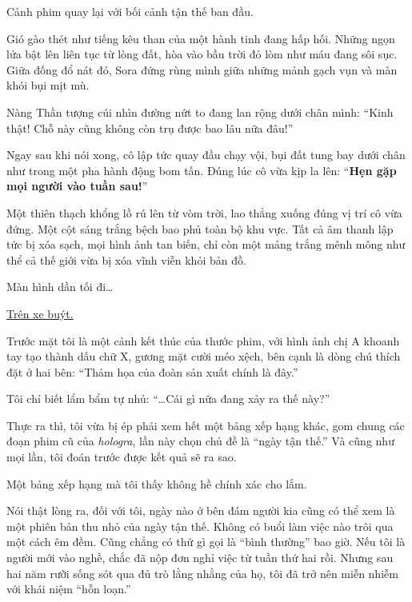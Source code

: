 \documentclass[../main.tex]{subfiles}
\begin{document}
\il

Cảnh phim quay lại với bối cảnh tận thế ban đầu.

Gió gào thét như tiếng kêu than của một hành tinh đang hấp hối. Những ngọn lửa bật lên liên tục từ lòng đất, hòa vào bầu trời đỏ lòm như máu đang sôi sục. Giữa đống đổ nát đó, Sora đứng rùng mình giữa những mảnh gạch vụn và màn khói bụi mịt mù.

Nàng Thần tượng cúi nhìn đường nứt to đang lan rộng dưới chân mình: ``Kinh thật! Chỗ này cũng không còn trụ được bao lâu nữa đâu!''

Ngay sau khi nói xong, cô lập tức quay đầu chạy vội, bụi đất tung bay dưới chân như trong một pha hành động bom tấn. Đúng lúc cô vừa kịp la lên: ``\textbf{Hẹn gặp mọi người vào tuần sau!}''

Một thiên thạch khổng lồ rú lên từ vòm trời, lao thẳng xuống đúng vị trí cô vừa đứng. Một cột sáng trắng bệch bao phủ toàn bộ khu vực. Tất cả âm thanh lập tức bị xóa sạch, mọi hình ảnh tan biến, chỉ còn một mảng trắng mênh mông như thể cả thế giới vừa bị xóa vĩnh viễn khỏi bản đồ.

Màn hình dần tối đi\dots
\omk


\begin{center}
  \uline{Trên xe buýt.}
\end{center}

Trước mặt tôi là một cảnh kết thúc của thước phim, với hình ảnh chị A khoanh tay tạo thành dấu chữ X, gương mặt cười méo xệch, bên cạnh là dòng chú thích đặt ở hai bên: ``Thảm họa của đoàn sản xuất chính là đây.''


Tôi chỉ biết lẩm bẩm tự nhủ: ``\dots Cái gì nữa đang xảy ra thế này?''

Thực ra thì, tôi vừa bị ép phải xem hết một bảng xếp hạng khác, gom chung các đoạn phim cũ của \textit{hologra}, lần này chọn chủ đề là ``ngày tận thế.'' Và cũng như mọi lần, tôi đoán trước được kết quả sẽ ra sao.

Một bảng xếp hạng mà tôi thấy không hề chính xác cho lắm.

Nói thật lòng ra, đối với tôi, ngày nào ở bên đám người kia cũng có thể xem là một phiên bản thu nhỏ của ngày tận thế. Không có buổi làm việc nào trôi qua một cách êm đềm. Cũng chẳng có thứ gì gọi là ``bình thường'' bao giờ. Nếu tôi là người mới vào nghề, chắc đã nộp đơn nghỉ việc từ tuần thứ hai rồi. Nhưng sau hai năm rưỡi sống sót qua đủ trò lằng nhằng của họ, tôi đã trở nên miễn nhiễm với khái niệm ``hỗn loạn.''
\end{document}
